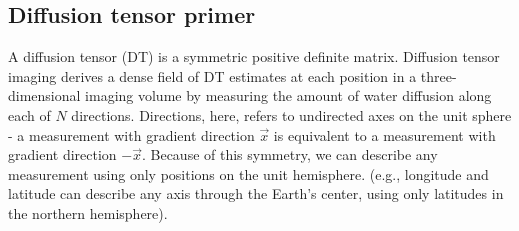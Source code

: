\documentclass[11pt,english]{article}
\begin{document}
\subsection{Diffusion tensor primer} A diffusion tensor (DT) is a
symmetric positive definite matrix.  Diffusion tensor imaging derives
a dense field of DT estimates at each position in a three-dimensional
imaging volume by measuring the amount of water
diffusion along each of $N$ directions. Directions, here, refers to
undirected axes on the unit sphere - a measurement with gradient direction $\vec{x}$ is equivalent to a measurement with
gradient direction $-\vec{x}$. Because of this symmetry, we can describe any measurement
using only positions on the unit hemisphere. (e.g., longitude and latitude can describe any axis through the Earth's center, using only 
latitudes in the northern hemisphere). 
\end{document}
